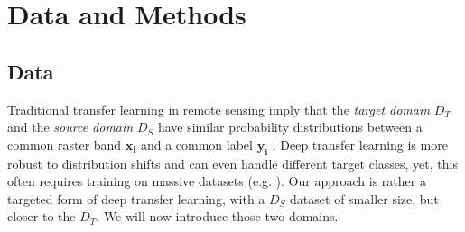 \documentclass[lettersize,journal]{IEEEtran}
\begin{document}
\section{Data and Methods}
\subsection{Data}
Traditional transfer learning in remote sensing imply that the \textit{target domain} $\mathit{D}_T$ and the \textit{source domain} $\mathit{D}_S$ have similar probability distributions between a common raster band
$\mathbf{x_i}$ and a common label $\mathbf{y_i}$ \cite{tuiaDomainAdaptationClassification2016}. Deep transfer learning is more robust to distribution shifts and can even handle different target classes, yet, this often 
requires training on massive datasets (e.g. \cite{heDeepResidualLearning2015,kirillovSegmentAnything2023}). 
Our approach is rather a targeted form of deep transfer learning, with a $\mathit{D}_S$ dataset of smaller size, but closer to the $\mathit{D}_T$. We will now introduce those two domains.
\end{document}
